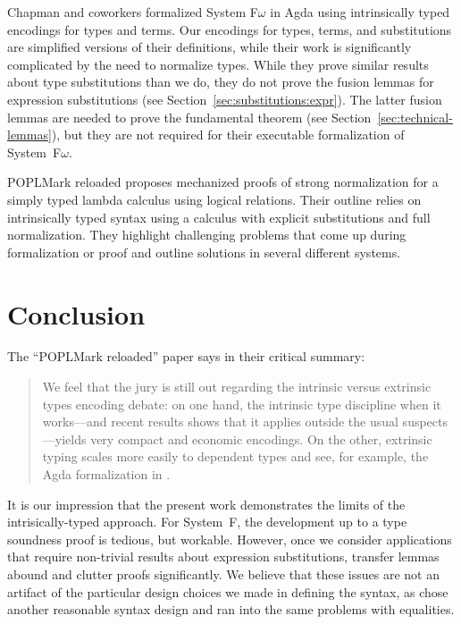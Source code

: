 \documentclass[acmsmall,anonymous,review,screen]{acmart}
\begin{document}
Chapman and coworkers \cite{DBLP:conf/mpc/ChapmanKNW19} formalized
System F$\omega$ in Agda using intrinsically typed encodings for types
and terms. Our encodings for types, terms, and substitutions are
simplified versions of their definitions, while their work is
significantly complicated by the need to normalize types. While they
prove similar results about type substitutions than we do, they do not
prove the fusion lemmas for expression substitutions (see
Section~\ref{sec:substitutions:expr}). The latter fusion lemmas are needed to
prove the fundamental theorem (see
Section~\ref{sec:technical-lemmas}), but they are not required for
their executable formalization of System~F$\omega$.

POPLMark reloaded \cite{DBLP:journals/jfp/AbelAHPMSS19} proposes
mechanized proofs of strong normalization for a simply typed lambda
calculus using logical relations. Their outline relies on
intrinsically typed syntax using a calculus with explicit
substitutions and full normalization. They highlight challenging
problems that come up during formalization or proof and outline
solutions in several different systems. 

\section{Conclusion}
\label{sec:conclusion}
\label{sec:future-work}

The ``POPLMark reloaded'' paper \cite[Section 5.1]{DBLP:journals/jfp/AbelAHPMSS19}
says in their critical summary:
\begin{quotation}
  We feel that the jury is still out regarding the intrinsic versus
  extrinsic types encoding debate: on one hand, the intrinsic type
  discipline when it works---and recent results
  \cite{DBLP:journals/pacmpl/PoulsenRTKV18} shows that it applies
  outside the usual suspects---yields very compact and economic
  encodings. On the other, extrinsic typing scales more easily to
  dependent types
  \cite{DBLP:conf/types/Danielsson06,DBLP:journals/entcs/Chapman09,DBLP:conf/popl/AltenkirchK16}
  and see, for example, the Agda formalization in \citet{DBLP:journals/pacmpl/0001OV18}. 
\end{quotation}
It is our impression that the present work demonstrates the limits of
the intrisically-typed approach. For System~F, the development up to a
type soundness proof is tedious, but workable. However, once we
consider applications that require non-trivial results about
expression substitutions, transfer lemmas abound and clutter proofs
significantly. We believe that these issues are not an artifact of the
particular design choices we made in defining the syntax, as
\citet{DBLP:journals/jar/BentonHKM12} chose another reasonable syntax
design and ran into the same problems with equalities.
\end{document}

